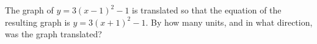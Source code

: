 The graph of $y=3(x-1)^2-1$ is translated so that the equation of the resulting graph is $y=3(x+1)^2-1$. By how many units, and in what direction, was the graph translated?
